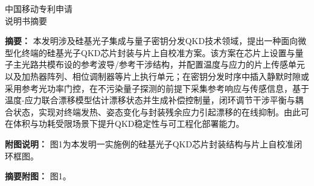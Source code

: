 \documentclass[12pt,a4paper]{article}
\begin{document}
\begin{center}
    {\Huge\heiti 中国移动专利申请} \\[0.5em]
    {\Huge\heiti 说明书摘要} \\[1em]
\end{center}

\noindent\textbf{摘要：}
本发明涉及硅基光子集成与量子密钥分发QKD技术领域，提出一种面向微型化终端的硅基光子QKD芯片封装与片上自校准方案。该方案在芯片上设置与量子主光路共模布设的参考波导/参考干涉结构，并配置温度与应力的片上传感单元以及加热器阵列、相位调制器等片上执行单元；在密钥分发时序中插入静默时隙或采用参考光功率门控，在不污染量子探测的前提下采集参考响应与传感信息，基于温度-应力联合漂移模型估计漂移状态并生成补偿控制量，闭环调节干涉平衡与耦合状态，实现对终端发热、姿态变化与封装残余应力引起漂移的在线抑制。由此可在体积与功耗受限场景下提升QKD稳定性与可工程化部署能力。

\vspace{0.6em}
\noindent\textbf{附图说明：}
图1为本发明一实施例的硅基光子QKD芯片封装结构与片上自校准闭环框图。

\vspace{0.2em}
\noindent\textbf{摘要附图：}
图1。
\end{document}
